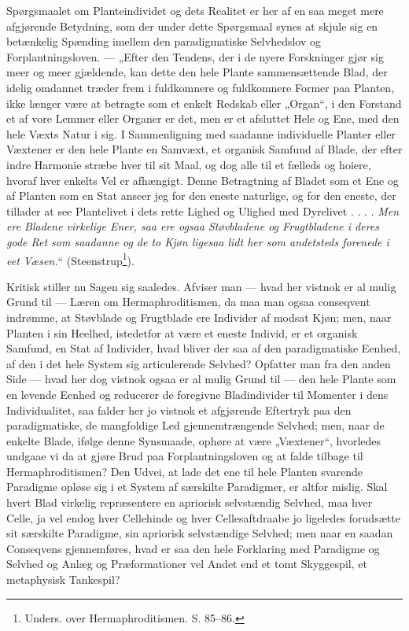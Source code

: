 \documentclass[11pt]{book}
\newcommand{\opage}[1]{\marginnote{\footnotesize\textit{[#1]}}}
\begin{document}
Spørgsmaalet om Planteindividet og dets Realitet er her af en saa
meget mere afgjørende Betydning, som der under dette Spørgsmaal
synes at skjule sig en betænkelig Spænding imellem den paradigmatiske
Selvhedslov og Forplantningsloven. --- „Efter den Tendens, der i de
nyere Forskninger gjør sig meer og meer gjældende, kan dette den hele
Plante sammensættende Blad, der idelig omdannet træder frem i
fuldkomnere og fuldkomnere Former paa Planten, ikke længer være at
betragte som et enkelt Redskab eller „Organ“, i den Forstand et af
vore Lemmer eller Organer er det, men er et afsluttet Hele og Ene,
med den hele Væxts Natur i sig. I Sammenligning med saadanne
individuelle Planter eller Væxtener er den hele Plante en Samvæxt, et
organisk Samfund af Blade, der efter indre Harmonie stræbe hver til
sit Maal, og dog alle til et fælleds og hoiere, hvoraf hver enkelts Vel
er afhængigt. Denne Betragtning af Bladet som et Ene og af Planten
som en Stat anseer jeg for den eneste naturlige, og for den eneste, der
tillader at see Plantelivet i dets rette Lighed og Ulighed med
Dyrelivet . . . . \emph{Men ere Bladene virkelige Ener, saa ere ogsaa
Støvbladene og Frugtbladene i deres gode Ret som saadanne og de to
Kjøn ligesaa lidt her som andetsteds forenede i eet Væsen.}“
(Steenstrup\footnote{Unders. over Hermaphroditismen. S. 85--86.}).

\opage{315} \setcounter{footnote}{0}%
Kritisk stiller nu Sagen sig saaledes. Afviser man --- hvad her
vistnok er al mulig Grund til --- Læren om Hermaphroditismen, da
maa man ogsaa conseqvent indrømme, at Støvblade og Frugtblade ere
Individer af modsat Kjøn; men, naar Planten i sin Heelhed,
istedetfor at være et eneste Individ, er et organisk Samfund, en Stat
af Individer, hvad bliver der saa af den paradigmatiske Eenhed, af
den i det hele System sig articulerende Selvhed? Opfatter man fra
den anden Side --- hvad her dog vistnok ogsaa er al mulig Grund til
--- den hele Plante som en levende Eenhed og reducerer de foregivne
Bladindivider til Momenter i dens Individualitet, saa falder her jo
vistnok et afgjørende Eftertryk paa den paradigmatiske, de mangfoldige
Led gjennemtrængende Selvhed; men, naar de enkelte Blade, ifølge
denne Synsmaade, ophøre at være „Væxtener“, hvorledes undgaae vi
da at gjøre Brud paa Forplantningsloven og at falde tilbage til
Hermaphroditismen? Den Udvei, at lade det ene til hele Planten
svarende Paradigme opløse sig i et System af særskilte Paradigmer, er
altfor mislig. Skal hvert Blad virkelig repræsentere en apriorisk
selvstændig Selvhed, maa hver Celle, ja vel endog hver Cellehinde og
hver Cellesaftdraabe jo ligeledes forudsætte sit særskilte Paradigme,
sin apriorisk selvstændige Selvhed; men naar en saadan Conseqvens
gjennemføres, hvad er saa den hele Forklaring med Paradigme og
Selvhed og Anlæg og Præformationer vel Andet end et tomt
Skyggespil, et metaphysisk Tankespil?
\end{document}

